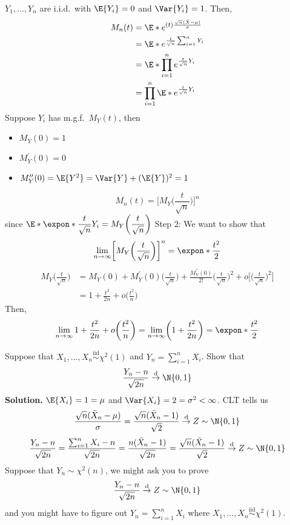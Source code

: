 $ Y_1,\ldots,Y_n $ are i.i.d.\ with $ \E{Y_i}=0 $
and $ \Var{Y_i}=1 $. Then,
\begin{align*}
    M_n(t)
     & =\E*{e^{(t)\frac{\sqrt{n}(\bar{X}-\mu)}{\sigma}}} \\
     & =\E*{e^{\frac{t}{\sqrt{n}} \sum_{i=1}^{n} Y_i}}   \\
     & =\E*{\prod_{i=1}^n e^{\frac{t}{\sqrt{n}} Y_i}}    \\
     & =\prod_{i=1}^n\E*{e^{\frac{t}{\sqrt{n}} Y_i}}     \\
\end{align*}
Suppose $ Y_i $ has m.g.f.\ $ M_Y(t) $, then
\begin{itemize}
    \item $ M_Y(0)=1 $
    \item $ M_Y^\prime(0)=0 $
    \item $ M_Y^{\prime\prime}(0)=\E{Y^2}=\Var{Y}+(\E{Y})^2=1 $
\end{itemize}
\[ M_n(t)=\biggl[M_Y\biggl( \frac{t}{\sqrt{n}} \biggr)\biggr]^n \]
since $
    \displaystyle \E*{\expon*{\frac{t}{\sqrt{n}}Y_i}}=M_Y\biggl(\frac{t}{\sqrt{n}}\biggr) $
Step 2: We want to show that
\[ \lim\limits_{{n} \to {\infty}}
    \biggl[M_Y\biggl(\frac{t}{\sqrt{n}} \biggr)\biggr]^n=\expon*{\frac{t^2}{2}} \]
\begin{align*}
    M_Y\biggl(\frac{t}{\sqrt{n}} \biggr)
     & =M_Y(0)+M_Y^\prime(0)\biggl(\frac{t}{\sqrt{n}} \biggr)+
    \frac{M_Y^{\prime\prime}(0)}{2!}\biggl(\frac{t}{\sqrt{n}} \biggr)^2
    +o\biggl[\biggl(\frac{t}{\sqrt{n}} \biggr)^2\biggr]        \\
     & =1+\frac{t^2}{2n} +o\biggl(\frac{t^2}{n}\biggr)
\end{align*}
Then,
\[ \lim\limits_{{n} \to {\infty}}1+\frac{t^2}{2n} +o\biggl(\frac{t^2}{n}\biggr)=
    \lim\limits_{{n} \to {\infty}} \biggl(1+\frac{t^2}{2n}\biggr)=\expon*{\frac{t^2}{2}}  \]
\begin{Example}{}{}
    Suppose that $ X_1,\ldots,X_n \stackrel{\text{iid}}{\sim} \chi^2(1) $
    and $ Y_n=\sum_{i=1}^{n} X_i $. Show that
    \[ \frac{Y_n-n}{\sqrt{2n}} \stackrel{\text{d}}{\to}\N{0,1} \]
    \textbf{Solution.} $ \E{X_i}=1=\mu $ and $ \Var{X_i}=2=\sigma^2<\infty $.
    CLT tells us
    \[ \frac{\sqrt{n}(\bar{X}_n-\mu)}{\sigma}=
        \frac{\sqrt{n}(\bar{X}_n-1)}{\sqrt{2}}\stackrel{\text{d}}{\to}Z\sim \N{0,1} \]
    \[ \frac{Y_n-n}{\sqrt{2n}}=
        \frac{\sum_{i=1}^{n} X_i-n}{\sqrt{2n}}=\frac{n(\bar{X}_n-1)}{\sqrt{2n}}
        =\frac{\sqrt{n}(\bar{X}_n-1)}{\sqrt{2}}\stackrel{\text{d}}{\to}Z\sim\N{0,1}  \]
    Suppose that $ Y_n \sim \chi^2(n) $, we might ask you to prove
    \[ \frac{Y_n-n}{\sqrt{2n}} \stackrel{\text{d}}{\to}Z\sim \N{0,1} \]
    and you might have to figure out $ Y_n=\sum_{i=1}^{n} X_i $
    where $ X_1,\ldots,X_n\stackrel{\text{iid}}{\sim}\chi^2(1) $.
\end{Example}
